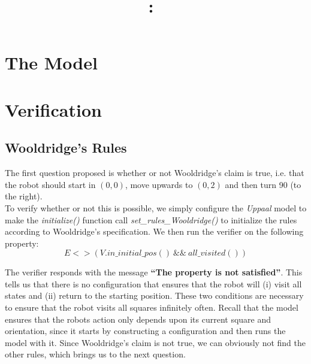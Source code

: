 \documentclass{article}
\title{
\vspace{2in}
\textmd{\textbf{\hmwkClass:\ \hmwkTitle}}\\
\vspace{0.1in}\large{\textit{\hmwkClassInstructor}}
\vspace{3in}
}
\author{\textbf{\hmwkAuthorName}}
\date{} %
\begin{document}
\maketitle



\newpage



\section{The Model}



\section{Verification}

\subsection{Wooldridge's Rules}

The first question proposed is whether or not Wooldridge's claim is true, i.e. that the robot should start in $(0,0)$, move upwards to $(0,2)$ and then turn 90\degree{} (to the right).
\\
To verify whether or not this is possible, we simply configure the \textit{Uppaal} model to make the \textit{initialize()} function call \textit{set\_rules\_Wooldridge()} to initialize the rules according to Wooldridge's specification.
We then run the verifier on the following property:
\[ E<>(V.in\_initial\_pos() ~ \&\& ~ all\_visited()) \]

The verifier responds with the message \textbf{``The property is not satisfied''}.
This tells us that there is no configuration that ensures that the robot will (i) visit all states and (ii) return to the starting position. 
These two conditions are necessary to ensure that the robot visits all squares infinitely often.
Recall that the model ensures that the robots action only depends upon its current square and orientation, since it starts by constructing a configuration and then runs the model with it.
Since Wooldridge's claim is not true, we can obviously not find the other rules, which brings us to the next question.
\end{document}
